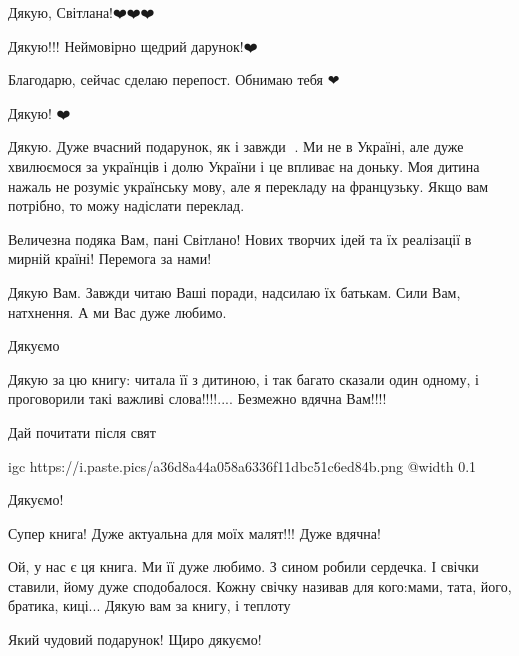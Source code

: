 
Дякую, Світлана!❤️❤️❤️


Дякую!!! Неймовірно щедрий дарунок!❤️🙏💛💙


Благодарю, сейчас сделаю перепост. Обнимаю тебя ❤


Дякую! ❤️


Дякую. Дуже вчасний подарунок, як і завжди 🙂. Ми не в Україні, але дуже
хвилюємося за українців і долю України і це впливає на доньку. Моя дитина
нажаль не розуміє українську мову, але я перекладу на французьку. Якщо вам
потрібно, то можу надіслати переклад.


Величезна подяка Вам, пані Світлано! Нових творчих ідей та їх реалізації в
мирній країні! Перемога за нами!


Дякую Вам. Завжди читаю Ваші поради, надсилаю їх батькам. Сили Вам, натхнення. А ми Вас дуже любимо.


Дякуємо💓


Дякую за цю книгу: читала її з дитиною, і так багато сказали один одному, і
проговорили такі важливі слова!!!!.... Безмежно вдячна Вам!!!!


Дай почитати після свят

\ifcmt
  igc https://i.paste.pics/a36d8a44a058a6336f11dbc51c6ed84b.png
	@width 0.1
\fi


Дякуємо!


Супер книга! Дуже актуальна для моїх малят!!! Дуже вдячна!


Ой, у нас є ця книга. Ми її дуже любимо. З сином робили сердечка. І свічки
ставили, йому дуже сподобалося. Кожну свічку називав для кого:мами, тата, його,
братика, киці... Дякую вам за книгу, і теплоту


Який чудовий подарунок! Щиро дякуємо!


